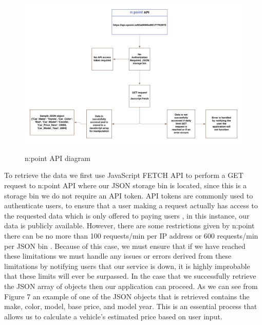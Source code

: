\documentclass[12pt]{article}
\begin{document}
\begin{figure}[H]
\caption{n:point API diagram}
\centering
\includegraphics[scale=.25]{figures/API.png}\\
\end{figure}
\noindent To retrieve the data we first use JavaScript FETCH API to perform a GET request to n:point API where our JSON storage bin is located, since this is a storage bin we do not require an API token. API tokens are commonly used to authenticate users, to ensure that a user making a request actually has access to the requested data which is only offered to paying users \cite{dataverse.org}, in this instance, our data is publicly available. However, there are some restrictions given by n:point there can be no more than 100 requests/min per IP address or 600 requests/min per JSON bin \cite{npoint.io}. Because of this case, we must ensure that if we have reached these limitations we must handle any issues or errors derived from these limitations by notifying users that our service is down, it is highly improbable that these limits will ever be surpassed. In the case that we successfully retrieve the JSON array of objects then our application can proceed. As we can see from Figure 7 an example of one of the JSON objects that is retrieved contains the make, color, model, base price, and model year. This is an essential process that allows us to calculate a vehicle's estimated price based on user input.
\end{document}
